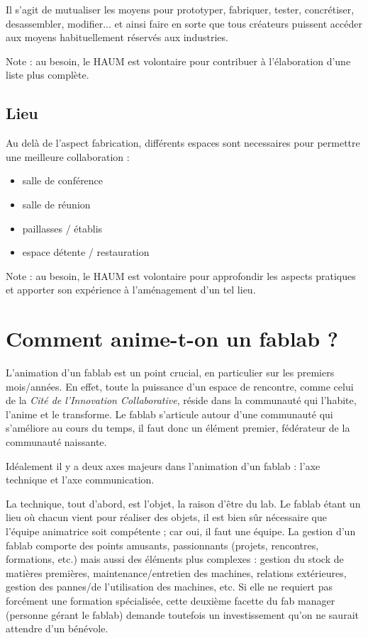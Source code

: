 \documentclass[a4paper,10pt]{scrartcl}
\begin{document}
Il s'agit de mutualiser les moyens pour prototyper, fabriquer, tester, concrétiser, desassembler, modifier... et ainsi faire en sorte que tous créateurs puissent accéder aux moyens habituellement réservés aux industries.

Note : au besoin, le HAUM est volontaire pour contribuer à l'élaboration d'une liste plus complète.

\subsection*{Lieu}

Au delà de l'aspect fabrication, différents espaces sont necessaires pour permettre une meilleure collaboration :
\begin{itemize}
 \item salle de conférence
 \item salle de réunion
 \item paillasses / établis
 \item espace détente / restauration
\end{itemize}

Note : au besoin, le HAUM est volontaire pour approfondir les aspects pratiques et apporter son expérience à l'aménagement d'un tel lieu.

\section{Comment anime-t-on un fablab ?}
L'animation d'un fablab est un point crucial, en particulier sur les premiers mois/années. En effet, toute la puissance d'un espace de rencontre, comme celui de la \emph{Cité de l'Innovation Collaborative}, réside dans la communauté qui l'habite, l'anime et le transforme.
Le fablab s'articule autour d'une communauté qui s'améliore au cours du temps, il faut donc un élément premier, fédérateur de la communauté naissante.

Idéalement il y a deux axes majeurs dans l'animation d'un fablab : l'axe technique et l'axe communication.

La technique, tout d'abord, est l'objet, la raison d'être du lab. Le fablab étant un lieu où chacun vient pour réaliser des objets, il est bien sûr nécessaire que l'équipe animatrice soit compétente ; car oui, il faut une équipe.
La gestion d'un fablab comporte des points amusants, passionnants (projets, rencontres, formations, etc.) mais aussi des éléments plus complexes : gestion du stock de matières premières, maintenance/entretien des machines, relations extérieures, gestion des pannes/de l'utilisation des machines, etc.
Si elle ne requiert pas forcément une formation spécialisée, cette deuxième facette du fab manager (personne gérant le fablab) demande toutefois un investissement qu'on ne saurait attendre d'un bénévole.
\end{document}
